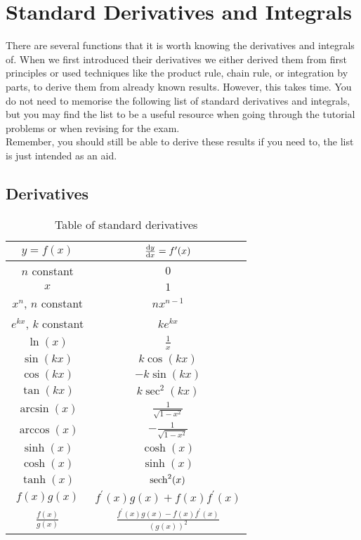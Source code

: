 
\chapter{Standard Derivatives and Integrals}
\label{sec: deriv sheet}

There are several functions that it is worth knowing the derivatives and integrals of. When we first introduced their derivatives we either derived them from first principles or used techniques like the product rule, chain rule, or integration by parts, to derive them from already known results. However, this takes time. You do not need to memorise the following list of standard derivatives and integrals, but you may find the list to be a useful resource when going through the tutorial problems or when revising for the exam. \\

Remember, you should still be able to derive these results if you need to, the list is just intended as an aid.

\section{Derivatives}

\begin{table}[ht]
\centering


\caption{Table of standard derivatives}

\vspace{2mm}

\label{table: derivatives}

\begin{tabular}{|c|c|} 
 \hline
$y=f(x)$ & $\frac{\mathrm{d} y}{\mathrm{d} x}=f^{\prime}(x) $\\
 \hline
$n$ constant & $0$  \\
 \hline
$x$ &$1$  \\
\hline
$x^{n}$, $n$ constant &	$nx^{n-1}$	\\
\hline
$e^{kx}$, $k$ constant &	$ke^{kx}$	\\
\hline
$\ln(x)$ &	$\frac{1}{x}$ 	\\
\hline
$\sin(k x)$ &	$k\cos(k x)$ 	\\
\hline
$\cos(kx)$ &	$-k\sin(kx)$\\
\hline
$\tan(kx)$ &	$k\sec^{2}(kx)$	\\
\hline
$\arcsin(x)$ &	$\frac{1}{\sqrt{1-x^{2}}} $	\\
\hline
$\arccos(x)$ & $-\frac{1}{\sqrt{1-x^{2}}}$ \\
\hline
$\sinh(x)$& $\cosh(x)$\\
\hline
$\cosh(x)$ & $\sinh(x)$\\
\hline
$\tanh(x)$ & $\operatorname{sech}^{2}(x)$\\
\hline
$f(x)g(x)$ & $f^{\prime}(x)g(x)+f(x)f^{\prime}(x)$\\
\hline
$\frac{f(x)}{g(x)}$ & $\frac{f^{\prime}(x)g(x)-f(x)f^{\prime}(x)}{(g(x))^{2}} $\\
\hline
\end{tabular}
\end{table}


